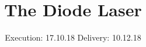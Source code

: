 

\subject{V 60}
\title{The Diode Laser}
\date{
  Execution: 17.10.18
  \hspace{3em}
  Delivery: 10.12.18
}



\maketitle
\thispagestyle{empty}
\tableofcontents
\newpage






\printbibliography




